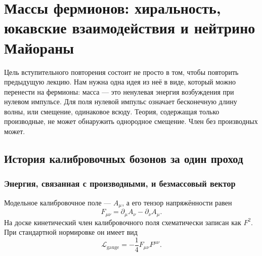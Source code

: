 \chapter{Массы фермионов: хиральность, юкавские взаимодействия и нейтрино Майораны}


Цель вступительного повторения состоит не просто в том, чтобы повторить предыдущую лекцию. Нам нужна одна идея из неё в виде, который можно перенести на фермионы: масса — это ненулевая энергия возбуждения при нулевом импульсе. Для поля нулевой импульс означает бесконечную длину волны, или смещение, одинаковое всюду. Теория, содержащая только производные, не может обнаружить однородное смещение. Член без производных может.

\section{История калибровочных бозонов за один проход}

\subsection{Энергия, связанная с производными, и безмассовый вектор}

Модельное калибровочное поле — \(A_\mu\), а его тензор напряжённости равен
\begin{equation}
  F_{\mu\nu}
  =\partial_\mu A_\nu-\partial_\nu A_\mu .
  \label{eq:l09-field-strength}
\end{equation}
На доске кинетический член калибровочного поля схематически записан как \(F^2\). При стандартной нормировке он имеет вид
\begin{equation}
  \mathcal L_{\mathrm{gauge}}
  =-\frac14 F_{\mu\nu}F^{\mu\nu}.
  \label{eq:l09-gauge-kinetic}
\end{equation}

